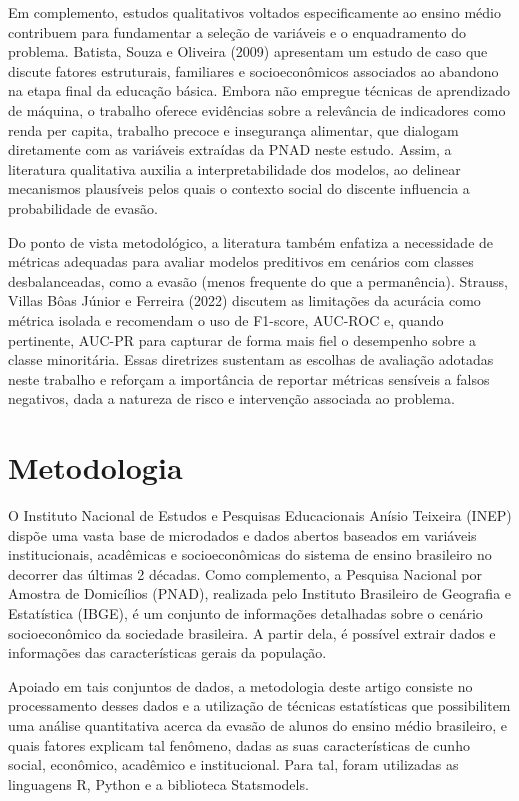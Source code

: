 \documentclass[english, spanish, brazilian]{RBIEarticle} %
\begin{document}
Em complemento, estudos qualitativos voltados especificamente ao ensino médio contribuem para
fundamentar a seleção de variáveis e o enquadramento do problema. Batista, Souza e Oliveira
(2009) apresentam um estudo de caso que discute fatores estruturais, familiares e socioeconômicos
associados ao abandono na etapa final da educação básica. Embora não empregue técnicas de
aprendizado de máquina, o trabalho oferece evidências sobre a relevância de indicadores como
renda per capita, trabalho precoce e insegurança alimentar, que dialogam diretamente com as
variáveis extraídas da PNAD neste estudo. Assim, a literatura qualitativa auxilia a interpretabilidade
dos modelos, ao delinear mecanismos plausíveis pelos quais o contexto social do discente
influencia a probabilidade de evasão.

Do ponto de vista metodológico, a literatura também enfatiza a necessidade de métricas adequadas
para avaliar modelos preditivos em cenários com classes desbalanceadas, como a evasão (menos
frequente do que a permanência). Strauss, Villas Bôas Júnior e Ferreira (2022) discutem as
limitações da acurácia como métrica isolada e recomendam o uso de F1-score, AUC-ROC e, quando
pertinente, AUC-PR para capturar de forma mais fiel o desempenho sobre a classe minoritária.
Essas diretrizes sustentam as escolhas de avaliação adotadas neste trabalho e reforçam a importância
de reportar métricas sensíveis a falsos negativos, dada a natureza de risco e intervenção associada ao
problema.



\section{Metodologia}
O Instituto Nacional de Estudos e Pesquisas Educacionais Anísio Teixeira (INEP) dispõe uma vasta base de microdados e dados abertos baseados em variáveis institucionais, acadêmicas e socioeconômicas do sistema de ensino brasileiro no decorrer das últimas 2 décadas. Como complemento, a Pesquisa Nacional por Amostra de Domicílios (PNAD), realizada pelo Instituto Brasileiro de Geografia e Estatística (IBGE), é um conjunto de informações detalhadas sobre o cenário socioeconômico da sociedade brasileira. A partir dela, é possível extrair dados e informações das características gerais da população.  

Apoiado em tais conjuntos de dados, a metodologia deste artigo consiste no processamento desses dados e a utilização de técnicas estatísticas que possibilitem uma análise quantitativa acerca da evasão de alunos do ensino médio brasileiro, e quais fatores explicam tal fenômeno, dadas as suas características de cunho social, econômico, acadêmico e institucional. Para tal, foram utilizadas as linguagens R, Python e a biblioteca Statsmodels.  
\end{document}
